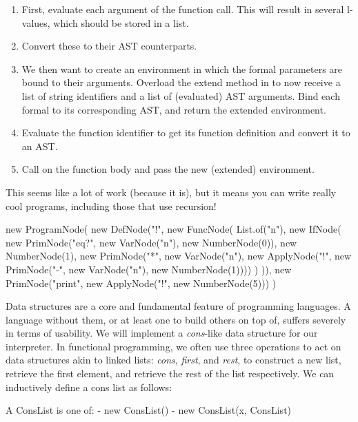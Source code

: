 \begin{enumerate}[label=(\alph*)]
  \begin{enumerate}[label=(\roman*)] 
  \item First, evaluate each argument of the function call. This will result in several l-values, which should be stored in a list. 
  \item Convert these to their AST counterparts. 
  \item We then want to create an environment in which the formal parameters are bound to their arguments. Overload the extend method in  to now receive a list of string identifiers and a list of (evaluated) AST arguments. Bind each formal to its corresponding AST, and return the extended environment. 
  \item Evaluate the function identifier to get its function definition and convert it to an AST.
  \item Call  on the function body and pass the new (extended) environment.
  \end{enumerate}
  This seems like a lot of work (because it is), but it means you can write really cool programs, including those that use recursion!
  \begin{verbnobox}[\small]
new ProgramNode(
  new DefNode("!", 
    new FuncNode(
      List.of("n"),
      new IfNode(
        new PrimNode("eq?", 
          new VarNode("n"), 
          new NumberNode(0)),
        new NumberNode(1),
        new PrimNode("*", 
          new VarNode("n"), 
          new ApplyNode("!", 
            new PrimNode("-", 
            new VarNode("n"), 
            new NumberNode(1))))
      )
    )),
  new PrimNode("print", new ApplyNode("!", new NumberNode(5)))
)
\end{verbnobox}
\end{enumerate}

Data structures are a core and fundamental feature of programming languages. A language without them, or at least one to build others on top of, suffers severely in terms of usability. We will implement a \textit{cons}-like data structure for our interpreter. In functional programming, we often use three operations to act on data structures akin to linked lists: \textit{cons}, \textit{first}, and \textit{rest}, to construct a new list, retrieve the first element, and retrieve the rest of the list respectively. We can inductively define a cons list as follows:

\begin{verbnobox}[\small]
A ConsList is one of:
 - new ConsList()
 - new ConsList(x, ConsList)
\end{verbnobox}

